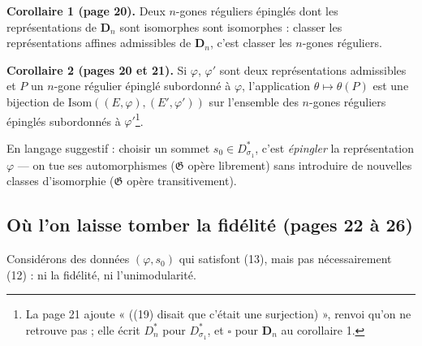 \documentclass[11pt,a4paper]{article}
\begin{document}
\textbf{Corollaire 1 (page 20).} Deux $n$-gones réguliers épinglés dont les
représentations de $\mathbf{D}_n$ sont isomorphes sont isomorphes : classer
les représentations affines admissibles de $\mathbf{D}_n$, c'est classer les
$n$-gones réguliers.

\textbf{Corollaire 2 (pages 20 et 21).} Si $\varphi$, $\varphi'$ sont deux
représentations admissibles et $P$ un $n$-gone régulier épinglé subordonné à
$\varphi$, l'application $\theta \mapsto \theta(P)$ est une bijection de
$\mathrm{Isom}((E, \varphi), (E', \varphi'))$ sur l'ensemble des $n$-gones
réguliers épinglés subordonnés à $\varphi'$\footnote{La page 21 ajoute
« ((19) disait que c'était une surjection) », renvoi qu'on ne retrouve pas ;
elle écrit $D_n^{*}$ pour $D_{\sigma_1}^{*}$, et $\square$ pour
$\mathbf{D}_n$ au corollaire 1.}.

En langage suggestif : choisir un sommet $s_0 \in D_{\sigma_1}^{*}$, c'est
\emph{épingler} la représentation $\varphi$ --- on tue ses automorphismes
($\mathfrak{G}$ opère librement) sans introduire de nouvelles classes
d'isomorphie ($\mathfrak{G}$ opère transitivement).

\subsection*{Où l'on laisse tomber la fidélité (pages 22 à 26)}

Considérons des données $(\varphi, s_0)$ qui satisfont (13), mais pas
nécessairement (12) : ni la fidélité, ni l'unimodularité.
\end{document}
